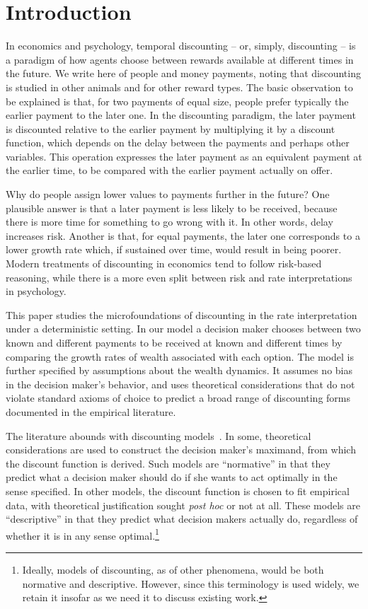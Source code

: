 \section{Introduction}\label{sec:introduction}


In economics and psychology, temporal discounting -- or, simply, discounting -- is a paradigm of how agents choose between rewards available at different times in the future. We write here of people and money payments, noting that discounting is studied in other animals and for other reward types. The basic observation to be explained is that, for two payments of equal size, people prefer typically the earlier payment to the later one. In the discounting paradigm, the later payment is discounted relative to the earlier payment by multiplying it by a discount function, which depends on the delay between the payments and perhaps other variables. This operation expresses the later payment as an equivalent payment at the earlier time, to be compared with the earlier payment actually on offer.

Why do people assign lower values to payments further in the future? One plausible answer is that a later payment is less likely to be received, because there is more time for something to go wrong with it. In other words, delay increases risk. Another is that, for equal payments, the later one corresponds to a lower growth rate which, if sustained over time, would result in being poorer. Modern treatments of discounting in economics tend to follow risk-based reasoning, while there is a more even split between risk and rate interpretations in psychology.

This paper studies the microfoundations of discounting in the rate interpretation under a deterministic setting. In our model a decision maker chooses between two known and different payments to be received at known and different times by comparing the growth rates of wealth associated with each option. The model is further specified by assumptions about the wealth dynamics. It assumes no bias in the decision maker's behavior, and uses theoretical considerations that do not violate standard axioms of choice to predict a broad range of discounting forms documented in the empirical literature.

The literature abounds with discounting models~\citep{CohenETAL2019}. In some, theoretical considerations are used to construct the decision maker's maximand, from which the discount function is derived. Such models are ``normative'' in that they predict what a decision maker should do if she wants to act optimally in the sense specified. In other models, the discount function is chosen to fit empirical data, with theoretical justification sought {\it post hoc} or not at all. These models are ``descriptive'' in that they predict what decision makers actually do, regardless of whether it is in any sense optimal.\footnote{Ideally, models of discounting, as of other phenomena, would be both normative and descriptive. However, since this terminology is used widely, we retain it insofar as we need it to discuss existing work.}

